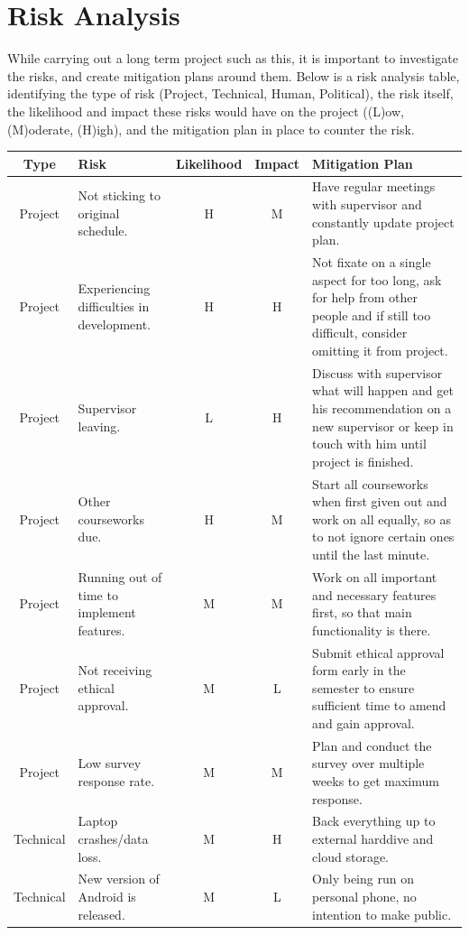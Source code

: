 \documentclass[a4paper]{report}
\begin{document}
\section{Risk Analysis} 
\label{sec:RiskAnalysis}
While carrying out a long term project such as this, it is important to investigate the risks, and create mitigation plans around them. Below is a risk analysis table, identifying the type of risk (Project, Technical, Human, Political), the risk itself, the likelihood and impact these risks would have on the project ((L)ow, (M)oderate, (H)igh), and the mitigation plan in place to counter the risk. 
\begin{center}
	\begin{longtable}{|c|p{50mm}|c|c|p{50mm}|}
		\hline
		Type & Risk & Likelihood & Impact & Mitigation Plan \\
		\hline
		Project & Not sticking to original schedule. & H & M & Have regular meetings with supervisor and constantly update project plan. \\
		\hline
		Project & Experiencing difficulties in development. & H & H & Not fixate on a single aspect for too long, ask for help from other people and if still too difficult, consider omitting it from project. \\
		\hline
		Project & Supervisor leaving. & L & H & Discuss with supervisor what will happen and get his recommendation on a new supervisor or keep in touch with him until project is finished. \\
		\hline
		Project & Other courseworks due. & H & M & Start all courseworks when first given out and work on all equally, so as to not ignore certain ones until the last minute.\\
		\hline
		Project & Running out of time to implement features. & M & M & Work on all important and necessary features first, so that main functionality is there. \\
		\hline
		Project & Not receiving ethical approval. & M & L & Submit ethical approval form early in the semester to ensure sufficient time to amend and gain approval. \\
		\hline
		Project & Low survey response rate. & M & M & Plan and conduct the survey over multiple weeks to get maximum response.\\
		\hline
		\hline 
		Technical & Laptop crashes/data loss. & M & H & Back everything up to external harddive and cloud storage.\\
		\hline
		Technical & New version of Android is released. & M & L & Only being run on personal phone, no intention to make public.\\

\end{longtable}
\end{center}
\end{document}
